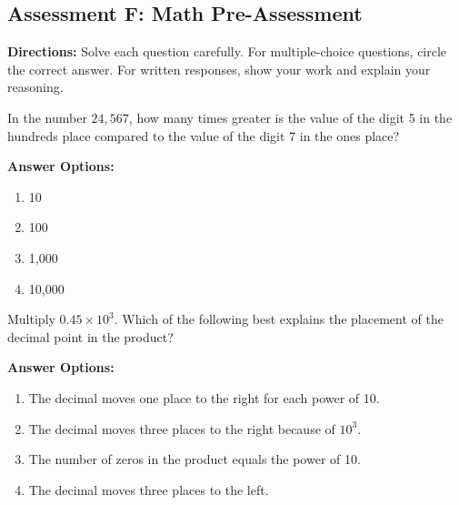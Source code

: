 \documentclass[12pt]{article}
\begin{document}
\subsection*{Assessment F: Math Pre-Assessment}
\onehalfspacing

\begin{tcolorbox}[colframe=black!50, colback=white, title=Assessment Directions]
\textbf{Directions:} Solve each question carefully. For multiple-choice questions, circle the correct answer. For written responses, show your work and explain your reasoning.
\end{tcolorbox}

\begin{tcolorbox}[colframe=black!50, colback=white, title=\textbf{Problem 1 (5.NBT.A.1)}]
In the number \(24,567\), how many times greater is the value of the digit 5 in the hundreds place compared to the value of the digit 7 in the ones place?

\textbf{Answer Options:}
\begin{enumerate}[label=(\Alph*), itemsep=0.5cm]
    \item 10
    \item 100
    \item 1,000
    \item 10,000
\end{enumerate}

\vspace{2cm}
\end{tcolorbox}

\begin{tcolorbox}[colframe=black!50, colback=white, title=\textbf{Problem 2 (5.NBT.A.2)}]
Multiply \(0.45 \times 10^3\). Which of the following best explains the placement of the decimal point in the product?  

\textbf{Answer Options:}
\begin{enumerate}[label=(\Alph*), itemsep=0.5cm]
    \item The decimal moves one place to the right for each power of 10.
    \item The decimal moves three places to the right because of \(10^3\).
    \item The number of zeros in the product equals the power of 10.
    \item The decimal moves three places to the left.
\end{enumerate}

\vspace{1cm}
\end{tcolorbox}
\end{document}
